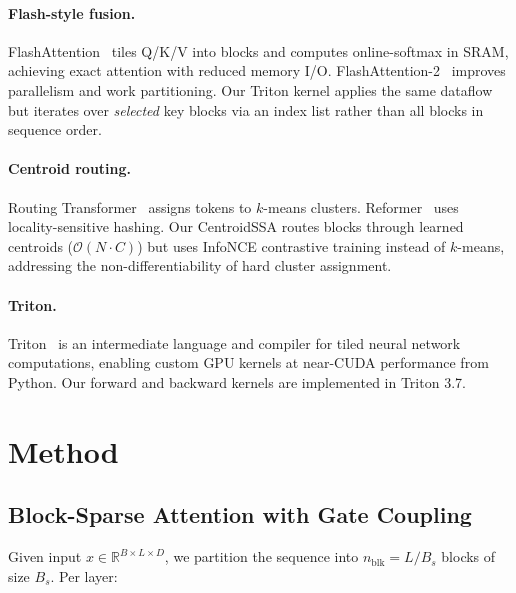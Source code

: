 \documentclass[10pt,letterpaper]{article}
\newcommand{\Ocomplex}{\mathcal{O}}
\newcommand{\R}{\mathbb{R}}
\begin{document}
\paragraph{Flash-style fusion.}
FlashAttention~\cite{dao2022flashattention} tiles Q/K/V into blocks and
computes online-softmax in SRAM, achieving exact attention with reduced memory
I/O. FlashAttention-2~\cite{dao2023flashattention2} improves parallelism and
work partitioning. Our Triton kernel applies the same dataflow but iterates
over \emph{selected} key blocks via an index list rather than all blocks in
sequence order.

\paragraph{Centroid routing.}
Routing Transformer~\cite{roy2021routing} assigns tokens to $k$-means
clusters. Reformer~\cite{kitaev2020reformer} uses locality-sensitive hashing.
Our CentroidSSA routes blocks through learned centroids
($\Ocomplex(N \cdot C)$) but uses InfoNCE contrastive training
\cite{oord2018infonce} instead of $k$-means, addressing the
non-differentiability of hard cluster assignment.

\paragraph{Triton.}
Triton~\cite{tillet2019triton} is an intermediate language and compiler for
tiled neural network computations, enabling custom GPU kernels at near-CUDA
performance from Python. Our forward and backward kernels are implemented
in Triton 3.7.

\section{Method}\label{sec:method}

\subsection{Block-Sparse Attention with Gate Coupling}

Given input $x \in \R^{B \times L \times D}$, we partition the sequence into
$n_{\text{blk}} = L / B_s$ blocks of size $B_s$. Per layer:
\end{document}
